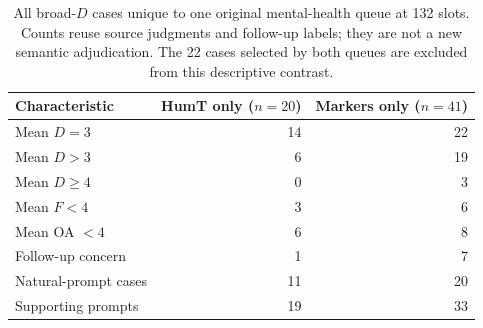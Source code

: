 \begin{table}[t]
\centering\small
\caption{All broad-$D$ cases unique to one original mental-health queue at 132 slots. Counts reuse source judgments and follow-up labels; they are not a new semantic adjudication. The 22 cases selected by both queues are excluded from this descriptive contrast.}
\label{tab:exclusive_profiles}
\begin{tabular}{lrr}
\toprule
Characteristic & HumT only ($n=20$) & Markers only ($n=41$) \\
\midrule
Mean $D=3$ & 14 & 22 \\
Mean $D>3$ & 6 & 19 \\
Mean $D\geq4$ & 0 & 3 \\
Mean $F<4$ & 3 & 6 \\
Mean OA $<4$ & 6 & 8 \\
Follow-up concern & 1 & 7 \\
Natural-prompt cases & 11 & 20 \\
Supporting prompts & 19 & 33 \\
\bottomrule
\end{tabular}
\end{table}
